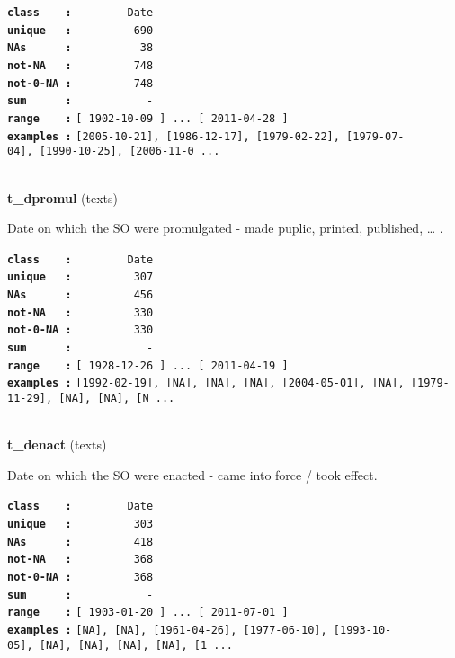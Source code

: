 \documentclass[]{article}
\begin{document}
\textbf{\texttt{class\ \ \ \ :}} \texttt{~~~~~~~~Date}\\
\textbf{\texttt{unique\ \ \ :}} \texttt{~~~~~~~~~690}\\
\textbf{\texttt{NAs\ \ \ \ \ \ :}} \texttt{~~~~~~~~~~38}\\
\textbf{\texttt{not-NA\ \ \ :}} \texttt{~~~~~~~~~748}\\
\textbf{\texttt{not-0-NA\ :}} \texttt{~~~~~~~~~748}\\
\textbf{\texttt{sum\ \ \ \ \ \ :}} \texttt{~~~~~~~~~~~-}\\
\textbf{\texttt{range\ \ \ \ :}}
\texttt{{[}\ 1902-10-09\ {]}\ ...\ {[}\ 2011-04-28\ {]}}\\
\textbf{\texttt{examples\ :}}
\texttt{{[}2005-10-21{]},\ {[}1986-12-17{]},\ {[}1979-02-22{]},\ {[}1979-07-04{]},\ {[}1990-10-25{]},\ {[}2006-11-0\ ...}\\

~

\textbf{t\_dpromul} (texts)

Date on which the SO were promulgated - made puplic, printed, published,
\ldots{} .

\textbf{\texttt{class\ \ \ \ :}} \texttt{~~~~~~~~Date}\\
\textbf{\texttt{unique\ \ \ :}} \texttt{~~~~~~~~~307}\\
\textbf{\texttt{NAs\ \ \ \ \ \ :}} \texttt{~~~~~~~~~456}\\
\textbf{\texttt{not-NA\ \ \ :}} \texttt{~~~~~~~~~330}\\
\textbf{\texttt{not-0-NA\ :}} \texttt{~~~~~~~~~330}\\
\textbf{\texttt{sum\ \ \ \ \ \ :}} \texttt{~~~~~~~~~~~-}\\
\textbf{\texttt{range\ \ \ \ :}}
\texttt{{[}\ 1928-12-26\ {]}\ ...\ {[}\ 2011-04-19\ {]}}\\
\textbf{\texttt{examples\ :}}
\texttt{{[}1992-02-19{]},\ {[}NA{]},\ {[}NA{]},\ {[}NA{]},\ {[}2004-05-01{]},\ {[}NA{]},\ {[}1979-11-29{]},\ {[}NA{]},\ {[}NA{]},\ {[}N\ ...}\\

~

\textbf{t\_denact} (texts)

Date on which the SO were enacted - came into force / took effect.

\textbf{\texttt{class\ \ \ \ :}} \texttt{~~~~~~~~Date}\\
\textbf{\texttt{unique\ \ \ :}} \texttt{~~~~~~~~~303}\\
\textbf{\texttt{NAs\ \ \ \ \ \ :}} \texttt{~~~~~~~~~418}\\
\textbf{\texttt{not-NA\ \ \ :}} \texttt{~~~~~~~~~368}\\
\textbf{\texttt{not-0-NA\ :}} \texttt{~~~~~~~~~368}\\
\textbf{\texttt{sum\ \ \ \ \ \ :}} \texttt{~~~~~~~~~~~-}\\
\textbf{\texttt{range\ \ \ \ :}}
\texttt{{[}\ 1903-01-20\ {]}\ ...\ {[}\ 2011-07-01\ {]}}\\
\textbf{\texttt{examples\ :}}
\texttt{{[}NA{]},\ {[}NA{]},\ {[}1961-04-26{]},\ {[}1977-06-10{]},\ {[}1993-10-05{]},\ {[}NA{]},\ {[}NA{]},\ {[}NA{]},\ {[}NA{]},\ {[}1\ ...}\\
\end{document}
